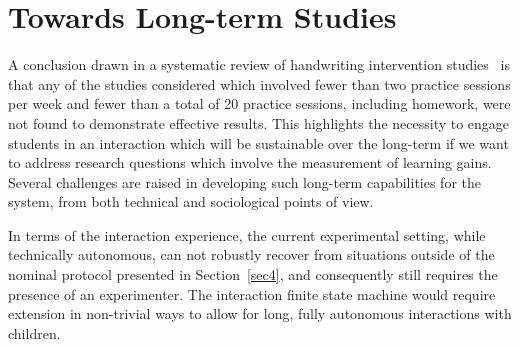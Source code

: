 \documentclass{sig-alternate}
\begin{document}




\section{Towards Long-term Studies}\label{sec:futureWork}

A conclusion drawn in a systematic review of handwriting intervention studies~\cite{Hoy2011} 
is that any of the studies considered which involved 
fewer than two practice sessions per week and fewer than a total of 20 practice 
sessions, including homework, were not found to demonstrate effective results. This 
highlights the necessity to engage students in an interaction which will be sustainable
 over the long-term if 
we want to address research questions which involve the measurement of learning gains. 
Several challenges are raised in developing such long-term capabilities for the system,
 from both technical and sociological points of view. %

In terms of the interaction experience, the current experimental setting, while
technically autonomous, can not robustly recover from situations outside of the
nominal protocol presented in Section~\ref{sec4}, and consequently still
requires the presence of an experimenter. The interaction finite state machine would
require extension in non-trivial ways to allow for long, fully autonomous
interactions with children.
\end{document}
